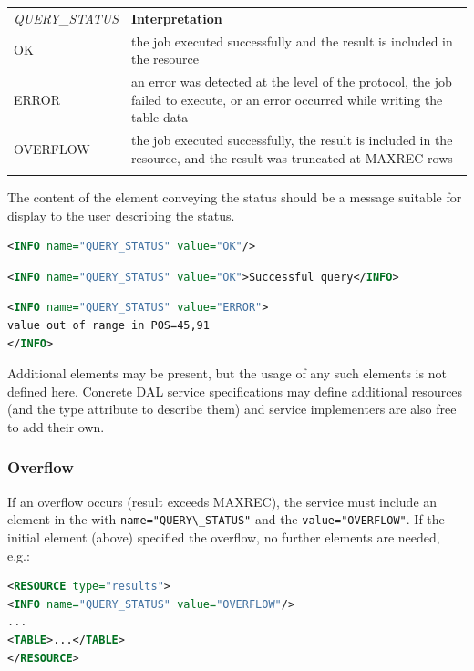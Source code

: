 \documentclass[11pt,letter]{ivoa}
\begin{document}
\begin{tabular}{l p{8cm}}
\sptablerule
\emph{QUERY\_STATUS}&\textbf{Interpretation}\\
\sptablerule
OK & the job executed successfully and the result is included in the resource \\
ERROR & an error was detected at the level of the protocol, the job failed to 
execute, or an error occurred while writing the table data \\
OVERFLOW & the job executed successfully, the result is included in the 
resource, and the result was truncated at MAXREC rows \\
\sptablerule
\label{tab:query-status}
\end{tabular}

The content of the  element conveying the status should be a message 
suitable for display to the user describing the status.

\begin{lstlisting}[language=XML]
<INFO name="QUERY_STATUS" value="OK"/>
\end{lstlisting}

\begin{lstlisting}[language=XML]
<INFO name="QUERY_STATUS" value="OK">Successful query</INFO>
\end{lstlisting}

\begin{lstlisting}[language=XML]
<INFO name="QUERY_STATUS" value="ERROR">
value out of range in POS=45,91
</INFO>
\end{lstlisting}

Additional  elements may be present, but the usage of any such elements 
is not defined here. Concrete DAL service specifications may define additional 
resources (and the type attribute to describe them) and service implementers are 
also free to add their own. 

\subsubsection{Overflow}
\label{sec:response-overflow}
If an overflow occurs (result exceeds MAXREC), the service must include an 
element in the  with \verb|name="QUERY\_STATUS"| and the 
\verb|value="OVERFLOW"|. If 
the initial  element (above) specified the overflow, no further elements are 
needed, e.g.:

\begin{lstlisting}[language=XML]
<RESOURCE type="results">
<INFO name="QUERY_STATUS" value="OVERFLOW"/>
...
<TABLE>...</TABLE>
</RESOURCE>
\end{lstlisting}
\end{document}
